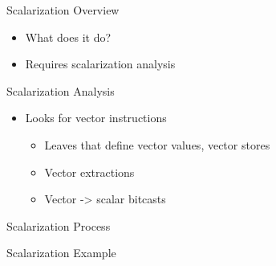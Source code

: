 
\begin{frame}{Scalarization Overview}

\begin{itemize}
    \item What does it do?
    \item Requires scalarization analysis
\end{itemize}

\end{frame}


\begin{frame}{Scalarization Analysis}

\begin{itemize}
    \item Looks for vector instructions
    \begin{itemize}
        \item Leaves that define vector values, vector stores
        \item Vector extractions
        \item Vector -> scalar bitcasts
    \end{itemize}
    
\end{itemize}

\end{frame}


\begin{frame}{Scalarization Process}


\end{frame}


\begin{frame}{Scalarization Example}


\end{frame}
